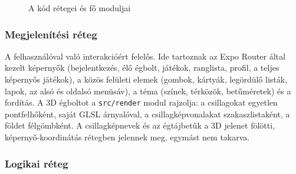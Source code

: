 \documentclass[12pt,a4paper]{article}
\newcommand{\kod}[1]{\texttt{\small #1}}
\begin{document}
\begin{figure}[H]
  \caption{A kód rétegei és fő moduljai}
  \label{fig:retegek}
\end{figure}

\subsubsection{Megjelenítési réteg}

A felhasználóval való interakcióért felelős. Ide tartoznak az Expo Router által kezelt képernyők
(bejelentkezés, élő égbolt, játékok, ranglista, profil, a teljes képernyős játékok), a közös
felületi elemek (gombok, kártyák, legördülő listák, lapok, az alsó és oldalsó menüsáv), a téma
(színek, térközök, betűméretek) és a fordítás. A 3D égboltot a \kod{src/render} modul rajzolja: a
csillagokat egyetlen pontfelhőként, saját GLSL árnyalóval, a csillagképvonalakat
szakaszlistaként, a földet félgömbként. A csillagképnevek és az égtájbetűk a 3D jelenet fölötti,
képernyő-koordinátás rétegben jelennek meg, egymást nem takarva.

\subsubsection{Logikai réteg}
\end{document}
